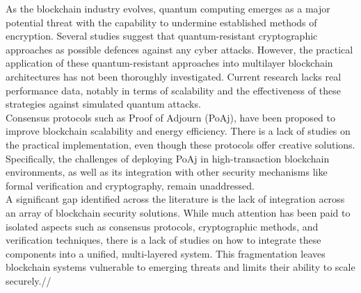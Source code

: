 \documentclass[a4paper, 12pt]{article}
\begin{document}
As the blockchain industry evolves, quantum computing emerges as a major potential threat with the capability to undermine established methods of encryption. Several studies suggest that quantum-resistant cryptographic approaches as possible defences against any cyber attacks. However, the practical application of these quantum-resistant approaches into multilayer blockchain architectures has not been thoroughly investigated. Current research lacks real performance data, notably in terms of scalability and the effectiveness of these strategies against simulated quantum attacks.\\

Consensus protocols such as Proof of Adjourn (PoAj), have been proposed to improve blockchain scalability and energy efficiency. There is a lack of studies on the practical implementation, even though these protocols offer creative solutions. Specifically, the challenges of deploying PoAj in high-transaction blockchain environments, as well as its integration with other security mechanisms like formal verification and cryptography, remain unaddressed.\\

A significant gap identified across the literature is the lack of integration across an array of blockchain security solutions. While much attention has been paid to isolated aspects such as consensus protocols, cryptographic methods, and verification techniques, there is a lack of studies on how to integrate these components into a unified, multi-layered system. This fragmentation leaves blockchain systems vulnerable to emerging threats and limits their ability to scale securely.//
\end{document}

